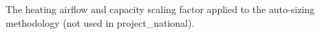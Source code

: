 The heating airflow and capacity scaling factor applied to the auto-sizing methodology (not used in project\_national).
